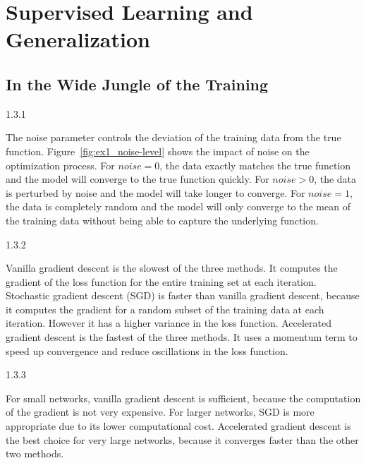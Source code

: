 
\section{Supervised Learning and Generalization}
\label{ex:1}


\setcounter{subsection}{2}
\subsection{In the Wide Jungle of the Training}
\label{ex:1.3}


\begin{task}{1.3.1}
\end{task}

The noise parameter controls the deviation of the training data from the true function.
Figure~\ref{fig:ex1_noise-level} shows the impact of noise on the optimization process. For $noise =
  0$, the data exactly matches the true function and the model will converge to the true function
quickly. For $noise > 0$, the data is perturbed by noise and the model will take longer to converge.
For $noise = 1$, the data is completely random and the model will only converge to the mean of the
training data without being able to capture the underlying function.


\begin{task}{1.3.2}
\end{task}

Vanilla gradient descent is the slowest of the three methods. It computes the gradient of the loss
function for the entire training set at each iteration. Stochastic gradient descent (SGD) is faster
than vanilla gradient descent, because it computes the gradient for a random subset of the training
data at each iteration. However it has a higher variance in the loss function. Accelerated gradient
descent is the fastest of the three methods. It uses a momentum term to speed up convergence and
reduce oscillations in the loss function.


\begin{task}{1.3.3}
\end{task}

For small networks, vanilla gradient descent is sufficient, because the computation of the gradient
is not very expensive. For larger networks, SGD is more appropriate due to its lower computational
cost. Accelerated gradient descent is the best choice for very large networks, because it converges
faster than the other two methods.


